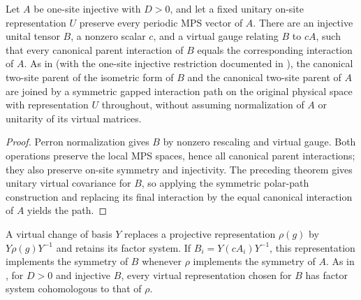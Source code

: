 \begin{lemma}
    \label{thm:spt_prepared_polar_gapped_path}
    \leanok
    Let $A$ be one-site injective with $D>0$, and let a fixed unitary
    on-site representation $U$ preserve every periodic MPS vector of $A$.
    There are an injective unital tensor $B$, a nonzero scalar $c$, and
    a virtual gauge relating $B$ to $cA$, such that every canonical
    parent interaction of $B$ equals the corresponding interaction of $A$.
    As in \cite[Section~II.C]{Schuch2011Phases} (with the one-site injective
    restriction documented in \cite{gap:spc11_uniform_gap_injective_scope}),
    the canonical two-site parent of the isometric form of $B$ and the
    canonical two-site parent of $A$ are joined by a symmetric gapped
    interaction path on the original physical space with representation $U$
    throughout, without assuming normalization of $A$ or unitarity of its
    virtual matrices.
\end{lemma}

\begin{proof}\leanok
    Perron normalization gives $B$ by nonzero rescaling and virtual gauge.
    Both operations preserve the local MPS spaces, hence all canonical
    parent interactions; they also preserve on-site symmetry and
    injectivity. The preceding theorem gives unitary virtual covariance
    for $B$, so applying the symmetric polar-path construction and replacing
    its final interaction by the equal canonical interaction of $A$ yields
    the path.
\end{proof}

\begin{lemma}
    \label{thm:spt_virtual_class_gauge_preparation}
    \leanok
    A virtual change of basis $Y$ replaces a projective representation
    $\rho(g)$ by $Y\rho(g)Y^{-1}$ and retains its factor system. If
    $B_i=Y(cA_i)Y^{-1}$, this representation implements the symmetry of
    $B$ whenever $\rho$ implements the symmetry of $A$. As in
    \cite[Sections~II.C and II.F.2]{Schuch2011Phases}, for $D>0$ and
    injective $B$, every virtual representation chosen for $B$ has factor
    system cohomologous to that of $\rho$.
\end{lemma}

